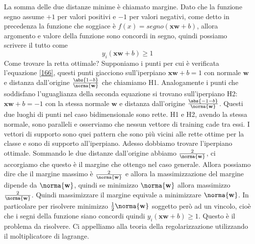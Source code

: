 La somma delle due distanze minime è chiamato margine. Dato che la funzione segno assume $+1$ per valori positivi e $-1$ per valori negativi, come detto in precedenza la funzione che soggiace è $f(x)=segno(\mathbf{x}\mathbf{w} + b)$, allora argomento e valore della funzione sono concordi in segno, quindi possiamo scrivere il tutto come
\begin{equation}
y_i(\mathbf{x}\mathbf{w} + b) \geq 1
\end{equation}
Come trovare la retta ottimale? Supponiamo i punti per cui è verificata l'equazione \ref{166}, questi punti giacciono sull'iperpiano $\mathbf{x}\mathbf{w} +b = 1$ con normale $\mathbf{w}$ e distanza dall'origine $\frac{\abs{1-b}}{\norma{\mathbf{w}}}$ che chiamiamo H1. Analogamente i punti che soddisfano l'uguaglianza della seconda equazione si trovano sull'iperpiano H2: $\mathbf{x}\mathbf{w} + b = -1$ con la stessa normale $\mathbf{w}$ e distanza dall'origine $\frac{\abs{-1-b}}{\norma{\mathbf{w}}}$. Questi due luoghi di punti nel caso bidimensionale sono rette. H1 e H2, avendo la stessa normale, sono paralleli e osserviamo che nessun vettore di training cade tra essi. I vettori di supporto sono quei pattern che sono più vicini alle rette ottime per la classe e sono di supporto all'iperpiano. Adesso dobbiamo trovare l'iperpiano ottimale. Sommando le due distanze dall'origine abbiamo $\frac{2}{\norma{\mathbf{w}}}$, ci accorgiamo che questo è il margine che ottengo nel caso generale. Allora possiamo dire che il margine massimo è $\frac{2}{\norma{\mathbf{w}}}$ e allora la massimizzazione del margine dipende da $\norma{\mathbf{w}}$, quindi se minimizzo $\norma{\mathbf{w}}$ allora massimizzo $\frac{2}{\norma{\mathbf{w}}}$. Quindi massimizzare il margine equivale a minimizzare $\norma{\mathbf{w}}$. In particolare per risolvere minimizzo $\frac{1}{2} \norma{\mathbf{w}}$ soggetto però ad un vincolo, cioè che i segni della funzione siano concordi quindi $y_i(\mathbf{x}\mathbf{w} + b) \geq 1$. Questo è il problema da risolvere. Ci appelliamo alla teoria della regolarizzazione utilizzando il moltiplicatore di lagrange.\\
 
